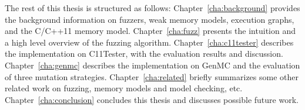 
The rest of this thesis is structured as follows: Chapter~\ref{cha:background} provides the background information on fuzzers, weak memory models, execution graphs, and the C/C++11 memory model. Chapter~\ref{cha:fuzz} presents the intuition and a high level overview of the fuzzing algorithm. Chapter~\ref{cha:c11tester} describes the implementation on C11Tester, with the evaluation results and discussion. Chapter~\ref{cha:genmc} describes the implementation on GenMC and the evaluation of three mutation strategies. Chapter~\ref{cha:related} briefly summarizes some other related work on fuzzing, memory models and model checking, etc. Chapter~\ref{cha:conclusion} concludes this thesis and discusses possible future work. 





